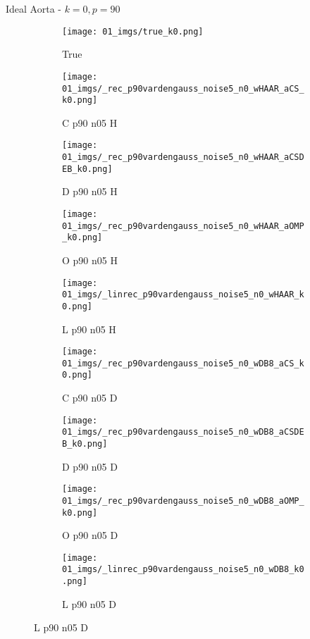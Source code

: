 \begin{frame}{Ideal Aorta - $k=0,p=90$}{}
\begin{figure}
\begin{subfigure}{0.1\textwidth}
\texttt{[image: 01\_imgs/true\_k0.png]}
\caption*{\Tiny True}
\end{subfigure}
\begin{subfigure}{0.1\textwidth}
\texttt{[image: 01\_imgs/\_rec\_p90vardengauss\_noise5\_n0\_wHAAR\_aCS\_k0.png]}
\caption*{\Tiny C p90 n05 H}
\end{subfigure}
\begin{subfigure}{0.1\textwidth}
\texttt{[image: 01\_imgs/\_rec\_p90vardengauss\_noise5\_n0\_wHAAR\_aCSDEB\_k0.png]}
\caption*{\Tiny D p90 n05 H}
\end{subfigure}
\begin{subfigure}{0.1\textwidth}
\texttt{[image: 01\_imgs/\_rec\_p90vardengauss\_noise5\_n0\_wHAAR\_aOMP\_k0.png]}
\caption*{\Tiny O p90 n05 H}
\end{subfigure}
\begin{subfigure}{0.1\textwidth}
\texttt{[image: 01\_imgs/\_linrec\_p90vardengauss\_noise5\_n0\_wHAAR\_k0.png]}
\caption*{\Tiny L p90 n05 H}
\end{subfigure}
\begin{subfigure}{0.1\textwidth}
\texttt{[image: 01\_imgs/\_rec\_p90vardengauss\_noise5\_n0\_wDB8\_aCS\_k0.png]}
\caption*{\Tiny C p90 n05 D}
\end{subfigure}
\begin{subfigure}{0.1\textwidth}
\texttt{[image: 01\_imgs/\_rec\_p90vardengauss\_noise5\_n0\_wDB8\_aCSDEB\_k0.png]}
\caption*{\Tiny D p90 n05 D}
\end{subfigure}
\begin{subfigure}{0.1\textwidth}
\texttt{[image: 01\_imgs/\_rec\_p90vardengauss\_noise5\_n0\_wDB8\_aOMP\_k0.png]}
\caption*{\Tiny O p90 n05 D}
\end{subfigure}
\begin{subfigure}{0.1\textwidth}
\texttt{[image: 01\_imgs/\_linrec\_p90vardengauss\_noise5\_n0\_wDB8\_k0.png]}
\caption*{\Tiny L p90 n05 D}
\end{subfigure}

\vspace{5pt}


\end{figure}
\end{frame}
